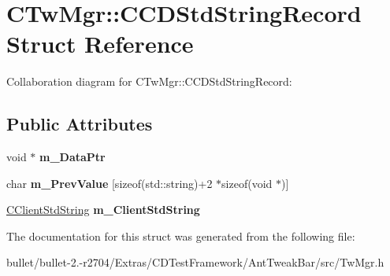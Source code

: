 \hypertarget{struct_c_tw_mgr_1_1_c_c_d_std_string_record}{\section{C\+Tw\+Mgr\+:\+:C\+C\+D\+Std\+String\+Record Struct Reference}
\label{struct_c_tw_mgr_1_1_c_c_d_std_string_record}
}


Collaboration diagram for C\+Tw\+Mgr\+:\+:C\+C\+D\+Std\+String\+Record\+:
\subsection*{Public Attributes}
\begin{DoxyCompactItemize}
\item 
\hypertarget{struct_c_tw_mgr_1_1_c_c_d_std_string_record_a725e13f2d586ed5f1c68e5fc19db5328}{void $\ast$ {\bfseries m\+\_\+\+Data\+Ptr}}\label{struct_c_tw_mgr_1_1_c_c_d_std_string_record_a725e13f2d586ed5f1c68e5fc19db5328}

\item 
\hypertarget{struct_c_tw_mgr_1_1_c_c_d_std_string_record_a93f4f94d83f4e9e456b044daf4816032}{char {\bfseries m\+\_\+\+Prev\+Value} \mbox{[}sizeof(std\+::string)+2 $\ast$sizeof(void $\ast$)\mbox{]}}\label{struct_c_tw_mgr_1_1_c_c_d_std_string_record_a93f4f94d83f4e9e456b044daf4816032}

\item 
\hypertarget{struct_c_tw_mgr_1_1_c_c_d_std_string_record_a3fbe000bbe0816f87d77bc65c9147bb0}{\hyperlink{struct_c_tw_mgr_1_1_c_client_std_string}{C\+Client\+Std\+String} {\bfseries m\+\_\+\+Client\+Std\+String}}\label{struct_c_tw_mgr_1_1_c_c_d_std_string_record_a3fbe000bbe0816f87d77bc65c9147bb0}

\end{DoxyCompactItemize}


The documentation for this struct was generated from the following file\+:\begin{DoxyCompactItemize}
\item 
bullet/bullet-\/2.-\/r2704/\+Extras/\+C\+D\+Test\+Framework/\+Ant\+Tweak\+Bar/src/Tw\+Mgr.\+h\end{DoxyCompactItemize}

